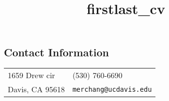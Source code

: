 \documentclass[margin,line,pifont,palatino,courier]{res}
\begin{document}
\title{firstlast_cv}
\begin{resume}

\section{\sc Contact Information}

\vspace{.05in}
\begin{tabular}{@{}p{2.75in}p{2in}}
1659 Drew cir & (530) 760-6690 \\
Davis, CA 95618                       & \verb+merchang@ucdavis.edu+\\
\end{tabular}





% 




%


\end{resume}
\end{document}
